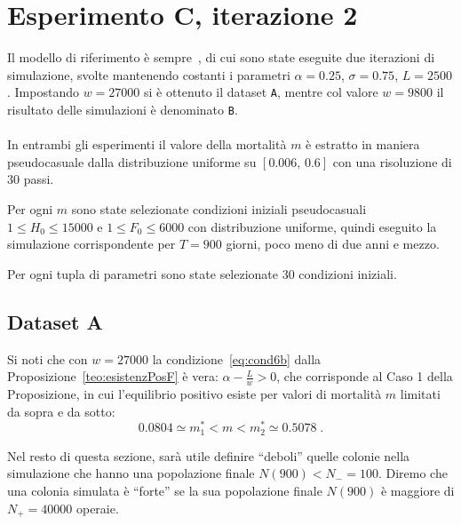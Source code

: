 \section{Esperimento C, iterazione 2}
Il modello di riferimento è sempre~\cite{khoury2011}, di cui sono state eseguite
due iterazioni di simulazione, svolte mantenendo costanti i parametri $\alpha = 0.25$, $\sigma=0.75$,
$L=2500$.
Impostando $w=27000$ si è ottenuto il dataset \texttt{A}, mentre col valore
$w=9800$ il risultato delle simulazioni è denominato \texttt{B}.

\paragraph{}
In entrambi gli esperimenti il valore della mortalità $m$ è estratto in maniera pseudocasuale dalla distribuzione
uniforme su $[0.006, \, 0.6]$
con una risoluzione di 30 passi.

Per ogni $m$ sono state selezionate condizioni iniziali pseudocasuali $1 \leq H_0 \leq 15000$ e
$1 \leq F_0 \leq 6000$ con distribuzione uniforme, quindi eseguito la simulazione corrispondente per $T=900$ giorni, poco meno di due anni e mezzo.

Per ogni tupla di parametri sono state selezionate 30 condizioni iniziali.

\subsection{Dataset A}
\label{sec:kh11expC2A}
Si noti che con $w=27000$ la condizione~\eqref{eq:cond6b} dalla Proposizione~\ref{teo:esistenzPosF} è vera:
$\alpha - \frac{L}{w} > 0$, che corrisponde al Caso 1 della Proposizione,
in cui l'equilibrio positivo esiste per valori di mortalità $m$ limitati da sopra e da sotto:
$$ 0.0804 \simeq m_1^* < m < m_2^* \simeq 0.5078 \; .$$

Nel resto di questa sezione, sarà utile definire ``deboli'' quelle colonie nella simulazione che hanno
una popolazione finale $N(900) < N_- = 100$.
Diremo che una colonia simulata è ``forte'' se la sua popolazione finale $N(900)$
è maggiore di $N_+ = 40000$ operaie.

